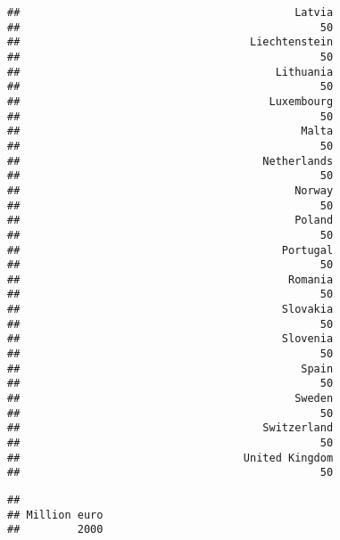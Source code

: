\documentclass[]{article}
\newenvironment{Shaded}{\begin{snugshade}}{\end{snugshade}}
\newcommand{\DataTypeTok}[1]{\textcolor[rgb]{0.13,0.29,0.53}{#1}}
\newcommand{\KeywordTok}[1]{\textcolor[rgb]{0.13,0.29,0.53}{\textbf{#1}}}
\newcommand{\NormalTok}[1]{#1}
\newcommand{\OperatorTok}[1]{\textcolor[rgb]{0.81,0.36,0.00}{\textbf{#1}}}
\newcommand{\StringTok}[1]{\textcolor[rgb]{0.31,0.60,0.02}{#1}}
\begin{document}
\begin{verbatim}
##                                           Latvia 
##                                               50 
##                                    Liechtenstein 
##                                               50 
##                                        Lithuania 
##                                               50 
##                                       Luxembourg 
##                                               50 
##                                            Malta 
##                                               50 
##                                      Netherlands 
##                                               50 
##                                           Norway 
##                                               50 
##                                           Poland 
##                                               50 
##                                         Portugal 
##                                               50 
##                                          Romania 
##                                               50 
##                                         Slovakia 
##                                               50 
##                                         Slovenia 
##                                               50 
##                                            Spain 
##                                               50 
##                                           Sweden 
##                                               50 
##                                      Switzerland 
##                                               50 
##                                   United Kingdom 
##                                               50
\end{verbatim}

\begin{Shaded}
\end{Shaded}

\begin{verbatim}
## 
## Million euro 
##         2000
\end{verbatim}

\begin{Shaded}
\end{Shaded}
\end{document}
